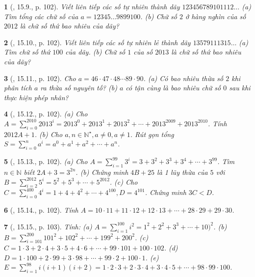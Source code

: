 \documentclass{article}
\newtheorem{baitoan}{}
\begin{document}
\begin{baitoan}[\cite{TLCT_THCS_Toan_6_so_hoc}, 15.9., p. 102]
	Viết liên tiếp các số tự nhiên thành dãy $123456789101112\ldots$ (a) Tìm tổng các chữ số của $a = 12345\ldots9899100$. (b) Chữ số $2$ ở hàng nghìn của số $2012$ là chữ số thứ bao nhiêu của dãy?
\end{baitoan}

\begin{baitoan}[\cite{TLCT_THCS_Toan_6_so_hoc}, 15.10., p. 102]
	Viết liên tiếp các số tự nhiên lẻ thành dãy $13579111315\ldots$ (a) Tìm chữ số thứ $100$ của dãy. (b) Chữ số $1$ của số $2013$ là chữ số thứ bao nhiêu của dãy?
\end{baitoan}

\begin{baitoan}[\cite{TLCT_THCS_Toan_6_so_hoc}, 15.11., p. 102]
	Cho $a = 46\cdot47\cdot48\cdots89\cdot90$. (a) Có bao nhiêu thừa số $2$ khi phân tích $a$ ra thừa số nguyên tố? (b) $a$ có tận cùng là bao nhiêu chữ số $0$ sau khi thực hiện phép nhân?
\end{baitoan}

\begin{baitoan}[\cite{TLCT_THCS_Toan_6_so_hoc}, 15.12., p. 102]
	(a) Cho $A = \sum_{i=0}^{2010} 2013^i = 2013^0 + 2013^1 + 2013^2 + \cdots + 2013^{2009} + 2013^{2010}$. Tính $2012A + 1$. (b) Cho $a,n\in\mathbb{N}^\star,a\ne0,a\ne1$. Rút gọn tổng $S = \sum_{i=0}^n a^i = a^0 + a^1 + a^2 + \cdots + a^n$.
\end{baitoan}

\begin{baitoan}[\cite{TLCT_THCS_Toan_6_so_hoc}, 15.13., p. 102]
	(a) Cho $A = \sum_{i=1}^{99} 3^i = 3 + 3^2 + 3^3 + 3^4 + \cdots + 3^{99}$. Tìm $n\in\mathbb{N}$ biết $2A + 3 = 3^{2n}$. (b) Chứng minh $4B + 25$ là 1 lũy thừa của $5$ với $B = \sum_{i=2}^{2012} 5^i = 5^2 + 5^3 + \cdots + 5^{2012}$. (c) Cho $C = \sum_{i=0}^{400} 4^i = 1 + 4 + 4^2 + \cdots + 4^{100},D = 4^{101}$. Chứng minh $3C < D$.
\end{baitoan}

\begin{baitoan}[\cite{TLCT_THCS_Toan_6_so_hoc}, 15.14., p. 102]
	Tính $A = 10\cdot11 + 11\cdot12 + 12\cdot13 + \cdots + 28\cdot29 + 29\cdot30$.
\end{baitoan}

\begin{baitoan}[\cite{TLCT_THCS_Toan_6_so_hoc}, 15.15., p. 103]
	Tính: (a) $A = \sum_{i=1}^{100} i^2 = 1^2 + 2^2 + 3^3 + \cdots + 10)^2$. (b) $B = \sum_{i=101}^{200} 101^2 + 102^2 + \cdots + 199^2 + 200^2$. (c) $C = 1\cdot3 + 2\cdot4 + 3\cdot5 + 4\cdot6 + \cdots + 99\cdot101 + 100\cdot102$. (d) $D = 1\cdot100 + 2\cdot99 + 3\cdot98 + \cdots + 99\cdot2 + 100\cdot1$. (e) $E = \sum_{i=1}^{98} i(i + 1)(i + 2) = 1\cdot2\cdot3 + 2\cdot3\cdot4 + 3\cdot4\cdot5 + \cdots + 98\cdot99\cdot100$.
\end{baitoan}
\end{document}
